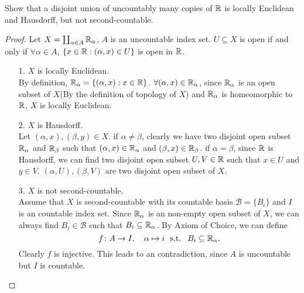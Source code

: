 \begin{problem}
  Show that a disjoint union of uncountably many copies of $\mathbb{R}$ is locally Euclidean and Hausdorff, but not second-countable.
  \begin{proof}
    Let $ X = \coprod_{\alpha \in A}\mathbb{R}_\alpha $, $ A $ is an uncountable index set. $ U \subseteq X $ is open if and only if $ \forall \alpha \in A$, $ \{x\in \mathbb{R}: (\alpha,x)\in U\}$ is open in $\mathbb{R}$.
    \begin{enumerate}
      \item[1.] $X$ is locally Euclidean. \\
      By definition, $\mathbb{R}_\alpha = \{(\alpha,x): x \in \mathbb{R}\}$. $\forall (\alpha, x) \in \mathbb{R}_\alpha$,  since $\mathbb{R}_\alpha$ is an open subset of $X$(By the definition of topology of $X$) and $\mathbb{R}_\alpha$ is homeomorphic to $\mathbb{R}$, $X$ is locally Euclidean.
      
      \item[2.] $X$ is Hausdorff. \\
      Let $(\alpha,x),(\beta,y) \in X$. if $\alpha \neq \beta$, clearly we have two disjoint open subset $\mathbb{R}_\alpha$ and $\mathbb{R}_\beta$ such that 
      $ (\alpha,x) \in \mathbb{R}_\alpha $ and $ (\beta,x) \in \mathbb{R}_\beta $. if $\alpha = \beta$, since $\mathbb{R}$ is Hausdorff, we can find two disjoint open subset $U,V \in \mathbb{R}$ such that $x \in U $ and $y \in V$. $(\alpha,U),(\beta,V)$ are two disjoint open subset of $X$.
      
      \item[3.] $X$ is not second-countable. \\
      Assume that $X$ is second-countable with its countable basis $\mathcal{B}=\{B_i\}$ and $I$ is an countable index set. Since $\mathbb{R}_\alpha$ is an non-empty open subset of $X$, we can always find $B_i \in \mathcal{B}$ such that $B_i \subseteq \mathbb{R}_\alpha$. By Axiom of Choice, we can define 
      $$ f \colon A \rightarrow I, \quad  \alpha \mapsto i \ \text{ s.t. } \ B_i \subseteq \mathbb{R}_{\alpha}. $$
      Clearly $f$ is injective. This leads to an contradiction, since $A$ is uncountable but $I$ is countable.
    \end{enumerate}
  \end{proof}
\end{problem}

